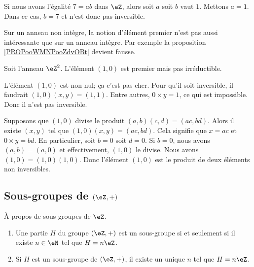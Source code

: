 \begin{example}
	Si nous avons l'égalité \( 7=ab\) dans \( \eZ\), alors soit \( a\) soit \( b\) vaut \( 1\). Mettons \( a=1\). Dans ce cas, \( b=7\) et n'est donc pas inversible.
\end{example}

Sur un anneau non intègre, la notion d'élément premier n'est pas aussi intéressante que sur un anneau intègre. Par exemple la proposition \ref{PROPooWMNPooZdvOBt} devient fausse.

\begin{example}     \label{EXooEIUEooCZCPMC}
	Soit l'anneau \( \eZ^2\). L'élément \( (1,0)\) est premier mais pas irréductible.
	\begin{subproof}
		L'élément \( (1,0)\) est non nul; ça c'est pas cher. Pour qu'il soit inversible, il faudrait \( (1,0)(x,y)=(1,1)\). Entre autres, \( 0\times y=1\), ce qui est impossible. Donc il n'est pas inversible.

		Supposons que \( (1,0)\) divise le produit \( (a,b)(c,d)=(ac,bd)\). Alors il existe \( (x,y)\) tel que \( (1,0)(x,y)=(ac,bd)\). Cela signifie que \( x=ac\) et \( 0\times y=bd\). En particulier, soit \( b=0\) soit \( d=0\). Si \( b=0\), nous avons \( (a,b)=(a,0)\) et effectivement, \( (1,0)\) le divise.
		Nous avons \( (1,0)=(1,0)(1,0)\). Donc l'élément \( (1,0)\) est le produit de deux éléments non inversibles.
	\end{subproof}
\end{example}


\subsection{Sous-groupes de \texorpdfstring{\( (\eZ,+)\)}{(Z,+)}}

\begin{proposition} \label{PropSsgpZestnZ}
	À propos de sous-groupes de \( \eZ\).
	\begin{enumerate}
		\item
		      Une partie \( H\) du groupe \( (\eZ,+)\) est un sous-groupe si et seulement si il existe \( n\in\eN\) tel que \( H=n\eZ\).
		\item       \label{ITEMooOWNZooUsYRok}
		      Si \( H\) est un sous-groupe de \( (\eZ,+)\), il existe un unique \( n\) tel que \( H=n\eZ\).
	\end{enumerate}
\end{proposition}

